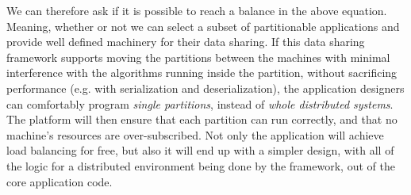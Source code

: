 We can therefore ask if it is possible to reach a balance in the above equation.
Meaning, whether or not we can select a subset of partitionable applications
and provide well defined machinery for their data sharing. If this data sharing
framework supports moving the partitions between the machines with minimal
interference with the algorithms running inside the partition, without
sacrificing performance (e.g. with serialization and deserialization), the
application designers can comfortably program \emph{single partitions}, instead
of \emph{whole distributed systems}. The platform will then ensure that each
partition can run correctly, and that no machine's resources are
over-subscribed. Not only the application will achieve load balancing for free,
but also it will end up with a simpler design, with all
of the logic for a distributed environment being done by the framework,
out of the core application code.

